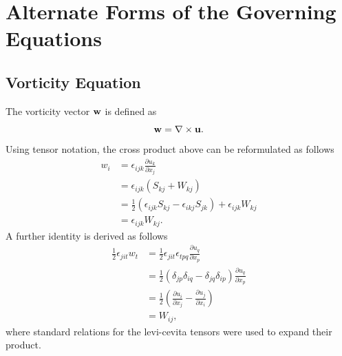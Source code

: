 \documentclass[oneside,a4paper,11pt]{report}
\begin{document}
\chapter{Alternate Forms of the Governing Equations}

\section{Vorticity Equation}

The vorticity vector $\mathbf{w}$ is defined as
\begin{equation}
\mathbf{w} = \nabla \times \mathbf{u}.
\end{equation}
Using tensor notation, the cross product above can be reformulated as follows
\begin{align}
w_i & = \epsilon_{ijk} \frac{\partial u_k}{\partial x_j} \nonumber \\
& = \epsilon_{ijk} (S_{kj} + W_{kj}) \nonumber \\
& = \frac{1}{2} (\epsilon_{ijk} S_{kj} - \epsilon_{ikj} S_{jk}) + \epsilon_{ijk} W_{kj} \nonumber \\
& = \epsilon_{ijk}W_{kj}.
\end{align}
A further identity is derived as follows
\begin{align}
\frac{1}{2} \epsilon_{jit} w_t &= \frac{1}{2} \epsilon_{jit} \epsilon_{tpq} \frac{\partial u_q}{\partial x_p} \nonumber \\
&= \frac{1}{2} (\delta_{jp} \delta_{iq} - \delta_{jq} \delta_{ip}) \frac{\partial u_q}{\partial x_p} \nonumber \\
&= \frac{1}{2} \left (\frac{\partial u_i}{\partial x_j} - \frac{\partial u_j}{\partial x_i} \right ) \nonumber \\
&= W_{ij},
\end{align}
where standard relations for the levi-cevita tensors were used to expand their product.
\end{document}
